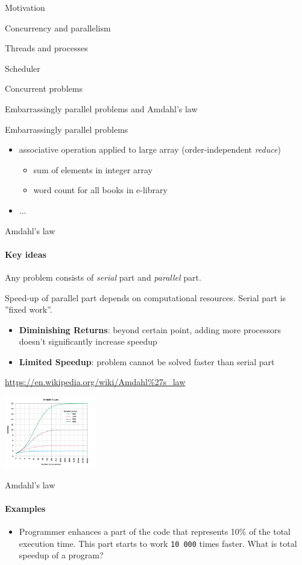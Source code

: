 \begin{section}{Motivation}
\begin{section}{Concurrency and parallelism}
\begin{section}{Threads and processes}
\begin{section}{Scheduler}
\begin{section}{Concurrent problems}
\begin{subsection}{Embarrassingly parallel problems and Amdahl's law}
\begin{frame}{Embarrassingly parallel problems}
\begin{itemize}
    \item associative operation applied to large array (order-independent \textit{reduce})
    \begin{itemize}
        \item sum of elements in integer array
        \item word count for all books in e-library    
    \end{itemize}

    \item ...
\end{itemize}
\end{frame}


\begin{frame}[fragile]{Amdahl's law}
\framesubtitle{Key ideas}

Any problem consists of \textit{serial} part and \textit{parallel} part.

Speed-up of parallel part depends on computational resources. Serial part is ''fixed work''.

\begin{itemize}
    \item \textbf{Diminishing Returns}: beyond certain point, adding more processors doesn't significantly increase speedup
    \item \textbf{Limited Speedup}: problem cannot be solved faster than serial part
\end{itemize}

{\tiny\url{https://en.wikipedia.org/wiki/Amdahl%27s_law}}
\begin{center}
\includegraphics[width=0.3\textwidth]{./pics/amdahl.png}
\end{center}
\end{frame}

\begin{frame}[fragile]{Amdahl's law}
\framesubtitle{Examples}

\begin{itemize}
    \item Programmer enhances a part of the code that represents 10\% of the total execution time. This part starts to work \texttt{10 000} times faster. What is total speedup of a program?


\end{itemize}
\end{frame}
\end{subsection}
\end{section}
\end{section}
\end{section}
\end{section}
\end{section}
